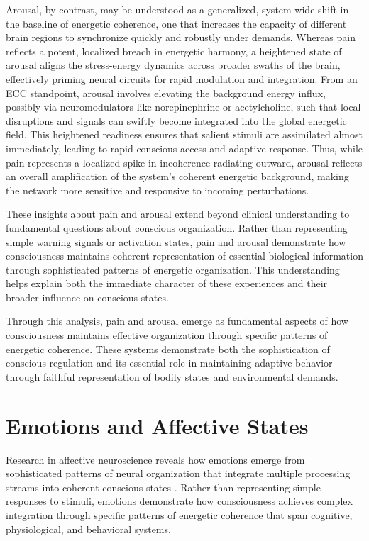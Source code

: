 \begin{refsection}
Arousal, by contrast, may be understood as a generalized, system-wide shift in the baseline of energetic coherence, one that increases the capacity of different brain regions to synchronize quickly and robustly under demands. Whereas pain reflects a potent, localized breach in energetic harmony, a heightened state of arousal aligns the stress-energy dynamics across broader swaths of the brain, effectively priming neural circuits for rapid modulation and integration. From an ECC standpoint, arousal involves elevating the background energy influx, possibly via neuromodulators like norepinephrine or acetylcholine, such that local disruptions and signals can swiftly become integrated into the global energetic field. This heightened readiness ensures that salient stimuli are assimilated almost immediately, leading to rapid conscious access and adaptive response. Thus, while pain represents a localized spike in incoherence radiating outward, arousal reflects an overall amplification of the system’s coherent energetic background, making the network more sensitive and responsive to incoming perturbations.

These insights about pain and arousal extend beyond clinical understanding to fundamental questions about conscious organization. Rather than representing simple warning signals or activation states, pain and arousal demonstrate how consciousness maintains coherent representation of essential biological information through sophisticated patterns of energetic organization. This understanding helps explain both the immediate character of these experiences and their broader influence on conscious states.

Through this analysis, pain and arousal emerge as fundamental aspects of how consciousness maintains effective organization through specific patterns of energetic coherence. These systems demonstrate both the sophistication of conscious regulation and its essential role in maintaining adaptive behavior through faithful representation of bodily states and environmental demands.


\section{Emotions and Affective States}

Research in affective neuroscience reveals how emotions emerge from sophisticated patterns of neural organization that integrate multiple processing streams into coherent conscious states \cite{Panksepp1998}. Rather than representing simple responses to stimuli, emotions demonstrate how consciousness achieves complex integration through specific patterns of energetic coherence that span cognitive, physiological, and behavioral systems.


\end{refsection}
